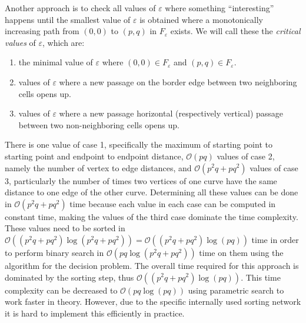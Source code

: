 \documentclass[
oneside,
fontsize=11pt
]{scrartcl}
\begin{document}
Another approach is to check all values of $\varepsilon$ where something ``interesting'' happens
until the smallest value of $\varepsilon$ is obtained where a monotonically increasing path 
from $(0,0)$ to $(p,q)$ in $F_\varepsilon$ exists.
We will call these the \textit{critical values} of $\varepsilon$, which are:
\begin{enumerate}
  \item the minimal value of $\varepsilon$ where $(0,0) \in F_\varepsilon$ and $(p,q) \in F_\varepsilon$.
  \item values of $\varepsilon$ where a new passage on the border edge 
        between two neighboring cells opens up.
  \item values of $\varepsilon$ where a new passage horizontal (respectively vertical) passage 
        between two non-neighboring cells opens up.
\end{enumerate}

There is one value of case 1, 
specifically the maximum of starting point to starting point and endpoint to endpoint distance,
$\mathcal{O}(pq)$ values of case 2, 
namely the number of vertex to edge distances,
and $\mathcal{O}(p^2q + pq^2)$ values of case 3,
particularly the number of times two vertices of one curve have the same distance to one edge of the other curve.
Determining all these values can be done in $\mathcal{O}(p^2q + pq^2)$ time 
because each value in each case can be computed in constant time, 
making the values of the third case dominate the time complexity.
These values need to be sorted in $\mathcal{O}((p^2q + pq^2) \log (p^2q + pq^2)) = \mathcal{O}((p^2q + pq^2) \log (pq))$ time
in order to perform binary search in $\mathcal{O}(pq \log (p^2q + pq^2))$ time on them
using the algorithm for the decision problem.
The overall time required for this approach is dominated by the sorting step, 
thus $\mathcal{O}((p^2q + pq^2) \log (pq))$.
This time complexity can be decreased to $\mathcal{O}(pq \log (pq))$ 
using parametric search \cite{megiddo_applying_1983, cole_slowing_1987} to work faster in theory.
However, due to the specific internally used sorting network 
it is hard to implement this efficiently in practice. \cite{alt_computing_1995}




\end{document}
